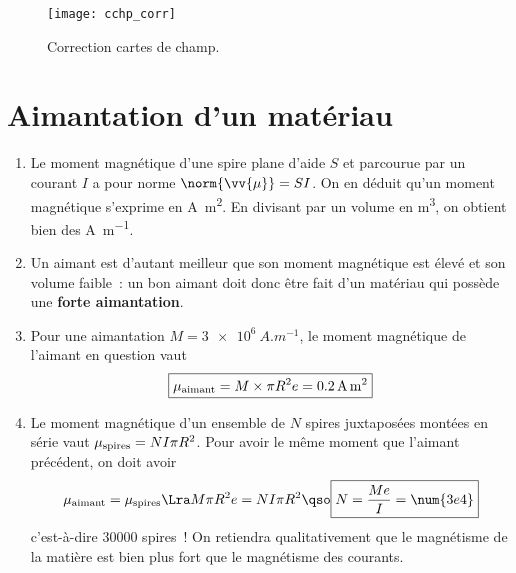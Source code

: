 \documentclass[a4paper, 11pt, final, garamond]{book}
\begin{document}
\begin{figure}[h]
  \centering
  \texttt{[image: cchp\_corr]}
  \caption{Correction cartes de champ.}
  \label{fig:excchpcorr}
\end{figure}

\section{Aimantation d'un matériau}
\label{sec:aimat}
\begin{enumerate}
  \item Le moment magnétique d'une spire plane d'aide $S$ et parcourue par un
    courant $I$ a pour norme $\norm{\vv{\mu}} = SI$. On en déduit qu'un moment
    magnétique s'exprime en \si{A.m^2}. En divisant par un volume en \si{m^3},
    on obtient bien des \si{A.m^{-1}}.
  \item Un aimant est d'autant meilleur que son moment magnétique est élevé et
    son volume faible~: un bon aimant doit donc être fait d'un matériau qui
    possède une \textbf{forte aimantation}.
  \item Pour une aimantation $M = \SI{3e6}{A.m ^{-1}}$, le moment magnétique de
    l'aimant en question vaut
    \[
      \boxed{\mu_{\rm aimant} = M\times\pi R^2 e = \SI{0.2}{A.m^2}}
    \]
  \item Le moment magnétique d'un ensemble de $N$ spires juxtaposées montées en
    série vaut $\mu_{\rm spires} = NI\pi R^2$. Pour avoir le même moment que l'aimant
    précédent, on doit avoir
    \[
      \mu_{\rm aimant} = \mu_{\rm spires}
      \Lra 
      M\pi R^2 e = NI\pi R^2
      \qso
      \boxed{N = \frac{Me}{I} = \num{3e4}}
    \]
    c'est-à-dire \num{30000} spires~! On retiendra qualitativement que le
    magnétisme de la matière est bien plus fort que le magnétisme des courants.
\end{enumerate}
\end{document}
